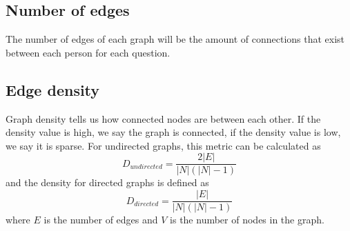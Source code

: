\subsection{Number of edges}
The number of edges of each graph will be the amount of connections that exist between each person for each question.

\subsection{Edge density}
Graph density tells us how connected nodes are between each other. If the density value is high, we say the graph is connected, if the density value is low, we say it is sparse. For undirected graphs, this metric can be calculated as
\begin{equation}
    D_{undirected} = \frac{2|E|}{|N|(|N|-1)}
    \label{equation:dir_density}
\end{equation}
and the density for directed graphs is defined as
\begin{equation}
    D_{directed} = \frac{|E|}{|N|(|N    |-1)}
    \label{equation:undir_density}
\end{equation}
where $E$ is the number of edges and $V$ is the number of nodes in the graph.

